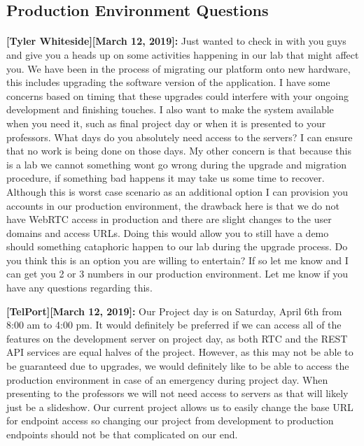 \documentclass[12pt]{article}
\begin{document}
\subsection{Production Environment Questions}

\paragraph{}
\textbf{[Tyler Whiteside][March 12, 2019]:} Just wanted to check in with you guys and give you a heads up on some activities happening in our lab that might affect you.   We have been in the process of migrating our platform onto new hardware, this includes upgrading the software version of the application.  I have some concerns based on timing that these upgrades could interfere with your ongoing development and finishing touches.  I also want to make the system available when you need it, such as final project day or when it is presented to your professors.  What days do you absolutely need access to the servers? I can ensure that no work is being done on those days. My other concern is that because this is a lab we cannot something wont go wrong during the upgrade and migration procedure, if something bad happens it may take us some time to recover. Although this is worst case scenario as an additional option I can provision you accounts in our production environment, the drawback here is that we do not have WebRTC access in production and there are slight changes to the user domains and access URLs.  Doing this would allow you to still have a demo should something cataphoric happen to our lab during the upgrade process.  Do you think this is an option you are willing to entertain?  If so let me know and I can get you 2 or 3 numbers in our production environment. Let me know if you have any questions regarding this.

\textbf{[TelPort][March 12, 2019]:} Our Project day is on Saturday, April 6th from 8:00 am to 4:00 pm. It would definitely be preferred if we can access all of the features on the development server on project day, as both RTC and the REST API services are equal halves of the project. However, as this may not be able to be guaranteed due to upgrades, we would definitely like to be able to access the production environment in case of an emergency during project day. When presenting to the professors we will not need access to servers as that will likely just be a slideshow. Our current project allows us to easily change the base URL for endpoint access so changing our project from development to production endpoints should not be that complicated on our end.
\end{document}
